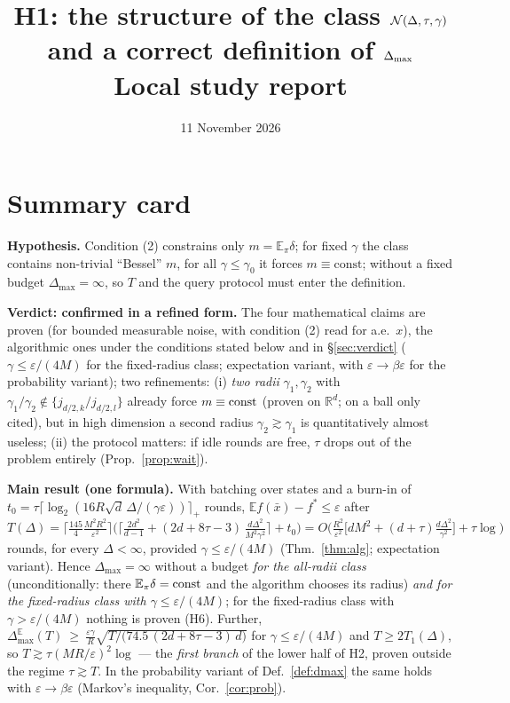 \documentclass[11pt,a4paper]{article}
\title{\textbf{H1: the structure of the class $\mathcal N(\Delta,\tau,\gamma)$\\ and a correct definition of $\Dmax$}\\[2pt]
\large Local study report}
\author{}
\date{11 November 2026}
\numberwithin{equation}{section}
\theoremstyle{definition}
\theoremstyle{remark}
\newcommand{\E}{\mathbb E}\newcommand{\R}{\mathbb R}\newcommand{\N}{\mathbb N}\newcommand{\Prob}{\mathbb P}
\newcommand{\Dmax}{\Delta_{\max}}\newcommand{\Dcp}{\Delta_{\rm cp}}
\begin{document}
\maketitle

\tableofcontents

\setcounter{section}{-1}
\section{Summary card}\label{sec:card}
\begin{tcolorbox}[card,title={H1 in one page}]
\textbf{Hypothesis.} Condition (2) constrains only $m=\E_\pi\delta$; for fixed $\gamma$ the class contains non-trivial ``Bessel'' $m$,
for all $\gamma\le\gamma_0$ it forces $m\equiv\mathrm{const}$; without a fixed budget $\Dmax=\infty$, so $T$ and the query protocol must enter the definition.

\textbf{Verdict: confirmed in a refined form.} The four mathematical claims are proven (for bounded measurable noise, with condition (2) read
for a.e.\ $x$), the algorithmic ones under the conditions stated below and in \S\ref{sec:verdict} ($\gamma\le\varepsilon/(4M)$ for the fixed-radius class; expectation variant, with $\varepsilon\to\beta\varepsilon$ for the probability variant); two refinements: (i) \emph{two radii} $\gamma_1,\gamma_2$ with $\gamma_1/\gamma_2\notin\{j_{d/2,k}/j_{d/2,l}\}$ already force $m\equiv{\rm const}$ (proven on $\R^d$; on a ball only cited), but in high dimension a second radius $\gamma_2\gtrsim\gamma_1$ is quantitatively almost useless;
(ii) the protocol matters: if idle rounds are free, $\tau$ drops out of the problem entirely (Prop.~\ref{prop:wait}).

\textbf{Main result (one formula).} With batching over states and a burn-in of $t_0=\tau\lceil\log_2(16R\sqrt d\,\Delta/(\gamma\varepsilon))\rceil_+$ rounds, $\E f(\bar x)-f^*\le\varepsilon$ after
\[
T(\Delta)=\Big\lceil\tfrac{145}{4}\tfrac{M^2R^2}{\varepsilon^2}\Big\rceil\Big(\Big\lceil \tfrac{2d^2}{d-1}+(2d+8\tau-3)\,\tfrac{d\Delta^2}{M^2\gamma^2}\Big\rceil+t_0\Big)
=O\!\Big(\tfrac{R^2}{\varepsilon^2}\big[dM^2+(d+\tau)\tfrac{d\Delta^2}{\gamma^2}\big]+\tau\log\Big)
\]
rounds, for every $\Delta<\infty$, provided $\gamma\le\varepsilon/(4M)$ (Thm.~\ref{thm:alg}; expectation variant). Hence $\Dmax=\infty$ without a budget \emph{for the all-radii class} (unconditionally: there $\E_\pi\delta={\rm const}$ and the algorithm chooses its radius) \emph{and for the fixed-radius class with $\gamma\le\varepsilon/(4M)$}; for the fixed-radius class with $\gamma>\varepsilon/(4M)$ nothing is proven (H6). Further,
$\Dmax^{\E}(T)\ \ge\ \frac{\varepsilon\gamma}{R}\sqrt{T/\big(74.5\,(2d+8\tau-3)\,d\big)}$ for $\gamma\le\varepsilon/(4M)$ and $T\ge 2T_1(\Delta)$, so $T\gtrsim\tau(MR/\varepsilon)^2\log$ --- the \emph{first branch} of the lower half of H2, proven outside the regime $\tau\gtrsim T$. In the probability variant of Def.~\ref{def:dmax} the same holds with $\varepsilon\to\beta\varepsilon$ (Markov's inequality, Cor.~\ref{cor:prob}).


\end{tcolorbox}
\end{document}
